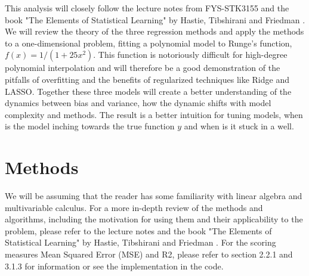 \documentclass[amssymb,twocolumn,aps]{revtex4}
\begin{document}
This analysis will closely follow the lecture notes from FYS-STK3155 \cite{compfys} and the book "The Elements of Statistical Learning" by Hastie, Tibshirani and Friedman \cite{hastie}.
We will review the theory of the three regression methods and apply the methods to a one-dimensional problem, fitting a polynomial model to Runge's function, $f(x)=1/(1+25x^2)$.
This function is notoriously difficult for high-degree polynomial interpolation and will therefore be a good demonstration of the pitfalls of overfitting and the benefits of regularized techniques like Ridge and LASSO.
Together these three models will create a better understanding of the dynamics between bias and variance, how the dynamic shifts with model complexity and methods.
The result is a better intuition for tuning models, when is the model inching towards the true function $y$ and when is it stuck in a well. 

\section{Methods}\label{section:methods}
We will be assuming that the reader has some familiarity with linear algebra and multivariable calculus.
For a more in-depth review of the methods and algorithms, including the motivation for using them and their applicability to the problem, please refer to the lecture notes \cite{compfys} and the book "The Elements of Statistical Learning" by Hastie, Tibshirani and Friedman \cite{hastie}.
For the scoring measures Mean Squared Error (MSE) and R2, please refer to \cite{scoring1} section 2.2.1 and 3.1.3 for information or see the implementation in the code.
\end{document}
